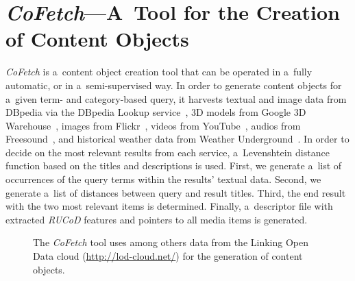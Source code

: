 \documentclass[runningheads,a4paper]{llncs}
\begin{document}
\section{\mbox{\emph{CoFetch}}---A~Tool for the Creation of Content Objects}
\mbox{\emph{CoFetch}} is a~content object creation tool
that can be operated in a~fully automatic, or in a~semi-supervised way.
In order to generate content objects for a~given term- and category-based query,
it harvests textual and image data from DBpedia
via the DBpedia Lookup service~\cite{lookup},
3D models from Google 3D Warehouse~\cite{3dwarehouse},
images from Flickr~\cite{flickr}, videos from YouTube~\cite{youtube},
audios from Freesound~\cite{freesound},
and historical weather data from Weather Underground~\cite{wunderground}.
In order to decide on the most relevant results from each service,
a~Levenshtein distance function based on the titles and descriptions is used.
First, we generate a~list of occurrences of the query terms
within the results' textual data.
Second, we generate a~list of distances between query and result titles.
Third, the end result with the two most relevant items is determined.
Finally, a~descriptor file with extracted \emph{\mbox{RUCoD}} features
and pointers to all media items is generated.

\begin{figure}[]
\vspace{-1.0em}
  \centering
    \qquad
\caption{The \mbox{\emph{CoFetch}} tool uses among others data from the Linking Open Data cloud (\url{http://lod-cloud.net/}) for the generation of content objects.}
\label{fig:cofetch}
\vspace{-2.8em}
\end{figure}



\end{document}
